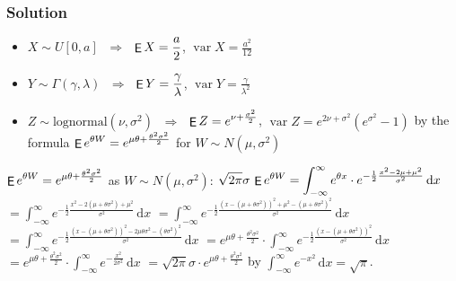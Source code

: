 \documentclass[10pt]{beamer}
\newcommand{\ds}{\displaystyle}
\newcommand{\ie}{\;\Longrightarrow\;}
\DeclareMathOperator\expc{{\sf E}}
\DeclareMathOperator\var{var}
\theoremstyle{definition}
\begin{document}
\begin{frame}[allowframebreaks]
  \frametitle{Solution}
  \begin{itemize}
    \item $X\sim U[0, a]$ $\ie$ $\ds\expc X = \frac{a}{2}$, $\ds\var X = \frac{a^2}{12}$ 
    \item $Y\sim \Gamma(\gamma, \lambda)$ $\ie$ $\ds\expc Y = \frac{\gamma}{\lambda}$, $\ds\var Y = \frac{\gamma}{\lambda^2}$
    \item $Z\sim\text{lognormal}(\nu,\sigma^2)$ $\ie$ $\ds\expc Z = e^{\nu + \frac{\sigma^2}{2}}$, $\ds\var Z = e^{2\nu + \sigma^2}(e^{\sigma^2} - 1)$ by the formula $\ds\expc{e^{\theta W}} = e^{\mu\theta + \frac{\theta^2\sigma^2}{2}}$ for $W\sim N(\mu, \sigma^2)$     
  \end{itemize}
  $\ds\expc{e^{\theta W}} = e^{\mu\theta + \frac{\theta^2\sigma^2}{2}}$ as $W\sim N(\mu, \sigma^2)$: $\ds\sqrt{2\pi}\sigma\,\expc{e^{\theta W}} = \int_{-\infty}^\infty e^{\theta x}\cdot e^{-\frac{1}{2}\frac{x^2 - 2\mu + \mu^2}{\sigma^2}}\,\text{d}x$ $\ds = \int_{-\infty}^\infty e^{-\frac{1}{2}\frac{x^2 - 2(\mu + \theta\sigma^2) + \mu^2}{\sigma^2}}\,\text{d}x$ $\ds = \int_{-\infty}^\infty e^{-\frac{1}{2}\frac{(x - (\mu + \theta\sigma^2))^2 + \mu^2 - (\mu + \theta\sigma^2)^2}{\sigma^2}}\,\text{d}x$ $\ds = \int_{-\infty}^\infty e^{-\frac{1}{2}\frac{(x - (\mu + \theta\sigma^2))^2 - 2\mu\theta\sigma^2 - (\theta\sigma^2)^2}{\sigma^2}}\,\text{d}x$ $\ds = e^{\mu\theta + \frac{\theta^2\sigma^2}{2}}\cdot\int_{-\infty}^\infty e^{-\frac{1}{2}\frac{(x - (\mu + \theta\sigma^2))^2}{\sigma^2}}\,\text{d}x$ $\ds = e^{\mu\theta + \frac{\theta^2\sigma^2}{2}}\cdot\int_{-\infty}^\infty e^{-\frac{x^2}{2\sigma^2}}\,\text{d}x$ $\ds = \sqrt{2\pi}\sigma\cdot e^{\mu\theta + \frac{\theta^2\sigma^2}{2}}$ by $\ds\int_{-\infty}^{\infty}e^{-x^2}\,\text{d}x = \sqrt{\pi}$.


\end{frame}
\end{document}
